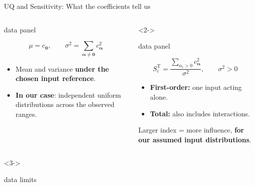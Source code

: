 \begin{frame}{UQ and Sensitivity: What the coefficients tell us}
  \begin{columns}[T,onlytextwidth]
      \begin{beamercolorbox}[sep=2.5mm,wd=\linewidth]{data panel}
        \begin{minipage}[t][35mm][t]{\dimexpr\linewidth-5mm\relax}
          \[
            \mu=c_{\mathbf0},\qquad
            \sigma^2=\sum_{\boldsymbol\alpha\ne\mathbf0}c_{\boldsymbol\alpha}^2
          \]
          \begin{itemize}
          \item \small Mean and variance \textbf{under the chosen input reference}.
          \item \textbf{In our case}: independent uniform distributions across the observed ranges.
          \end{itemize}
        \end{minipage}
      \end{beamercolorbox}
      \begin{uncoverenv}<2->
      \begin{beamercolorbox}[sep=2.5mm,wd=\linewidth]{data panel}
        \begin{minipage}[t][35mm][t]{\dimexpr\linewidth-5mm\relax}
          \small\raggedright
          \[
            S_i^{\mathrm T}=\frac{\sum_{\alpha_i>0}c_{\boldsymbol\alpha}^{2}}{\sigma^2},
            \qquad\sigma^2>0
          \]
          \begin{itemize}
            \item \textbf{First-order:} one input acting alone.
            \item \textbf{Total:} also includes interactions.
          \end{itemize}
          \smallskip
          \footnotesize\color{black!65} Larger index = more influence, \textbf{for our assumed input distributions}.
        \end{minipage}
      \end{beamercolorbox}
      \end{uncoverenv}
  \end{columns}
  \smallskip
  \begin{uncoverenv}<3->
  \begin{beamercolorbox}[sep=1.5mm,wd=\textwidth]{data limits}

\end{beamercolorbox}
\end{uncoverenv}
\end{frame}
